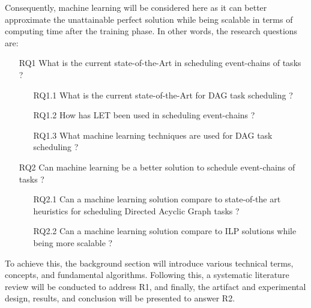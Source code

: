 Consequently, machine learning will be considered here as it can 
better approximate the unattainable perfect solution while being 
scalable in terms of computing time after the training phase. In 
other words, the research questions are:

\begin{itemize}
    \item [RQ1] What is the current state-of-the-Art in scheduling event-chains of tasks ?
            \begin{itemize}
                \item [RQ1.1] What is the current state-of-the-Art for DAG task scheduling ?
                \item [RQ1.2] How has LET been used in scheduling event-chains ?
                \item [RQ1.3] What machine learning  techniques are used for DAG task scheduling ?
            \end{itemize}
    \item [RQ2]  Can machine learning be a better solution to schedule event-chains of tasks ?
            \begin{itemize}
                \item [RQ2.1] Can a machine learning solution compare to state-of-the art heuristics for scheduling Directed Acyclic Graph tasks ?
                \item [RQ2.2] Can a machine learning solution compare to ILP solutions while being more scalable ?
            \end{itemize}    
\end{itemize}

To achieve this, the background section will introduce various 
technical terms, concepts, and fundamental algorithms. 
Following this, a systematic literature review will be conducted to address R1, 
and finally, the artifact and experimental design, results, and conclusion will 
be presented to answer R2.




